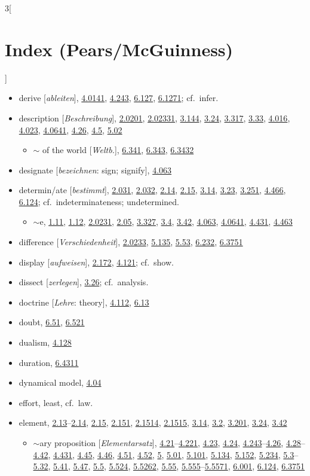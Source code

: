 \documentclass[oneside,openany,12pt]{book}
\newcommand{\indexentry}[1]{\item #1}
\newcommand{\indexsubentry}[1]{\begin{itemize} \item #1 \end{itemize}}
\newcommand{\indexref}[1]{\hyperlink{prop#1}{#1}}
\newcommand{\indexgap}{\bigskip}
\begin{document}
\begin{multicols}{3}[\section*{Index (Pears/McGuinness)}]
\begin{itemize}
\indexentry{derive [\textit{ableiten}], \indexref{4.0141}, \indexref{4.243}, \indexref{6.127}, \indexref{6.1271}; cf.\ infer.}

\indexentry{description [\textit{Beschreibung}], \indexref{2.0201}, \indexref{2.02331}, \indexref{3.144}, \indexref{3.24}, \indexref{3.317}, \indexref{3.33}, \indexref{4.016}, \indexref{4.023}, \indexref{4.0641}, \indexref{4.26}, \indexref{4.5}, \indexref{5.02}}

   \indexsubentry{$\sim$ of the world [\textit{Weltb.}], \indexref{6.341}, \indexref{6.343}, \indexref{6.3432}}

\indexentry{designate [\textit{bezeichnen}: sign; signify], \indexref{4.063}}

\indexentry{determin/ate [\textit{bestimmt}], \indexref{2.031}, \indexref{2.032}, \indexref{2.14}, \indexref{2.15}, \indexref{3.14}, \indexref{3.23}, \indexref{3.251}, \indexref{4.466}, \indexref{6.124}; cf.\ indeterminateness; undetermined.}

   \indexsubentry{$\sim$e, \indexref{1.11}, \indexref{1.12}, \indexref{2.0231}, \indexref{2.05}, \indexref{3.327}, \indexref{3.4}, \indexref{3.42}, \indexref{4.063}, \indexref{4.0641}, \indexref{4.431}, \indexref{4.463}}

\indexentry{difference [\textit{Verschiedenheit}], \indexref{2.0233}, \indexref{5.135}, \indexref{5.53}, \indexref{6.232}, \indexref{6.3751}}

\indexentry{display [\textit{aufweisen}], \indexref{2.172}, \indexref{4.121}; cf.\ show.}

\indexentry{dissect [\textit{zerlegen}], \indexref{3.26}; cf.\ analysis.}

\indexentry{doctrine [\textit{Lehre}: theory], \indexref{4.112}, \indexref{6.13}}

\indexentry{doubt, \indexref{6.51}, \indexref{6.521}}

\indexentry{dualism, \indexref{4.128}}

\indexentry{duration, \indexref{6.4311}}

\indexentry{dynamical model, \indexref{4.04}}

\indexgap

\indexentry{effort, least, cf.\ law.}

\indexentry{element, \indexref{2.13}--\indexref{2.14}, \indexref{2.15}, \indexref{2.151}, \indexref{2.1514}, \indexref{2.1515}, \indexref{3.14}, \indexref{3.2}, \indexref{3.201}, \indexref{3.24}, \indexref{3.42}}

   \indexsubentry{$\sim$ary proposition [\textit{Elementarsatz}], \indexref{4.21}--\indexref{4.221}, \indexref{4.23}, \indexref{4.24}, \indexref{4.243}--\indexref{4.26}, \indexref{4.28}--\indexref{4.42}, \indexref{4.431}, \indexref{4.45}, \indexref{4.46}, \indexref{4.51}, \indexref{4.52}, \indexref{5}, \indexref{5.01}, \indexref{5.101}, \indexref{5.134}, \indexref{5.152}, \indexref{5.234}, \indexref{5.3}--\indexref{5.32}, \indexref{5.41}, \indexref{5.47}, \indexref{5.5}, \indexref{5.524}, \indexref{5.5262}, \indexref{5.55}, \indexref{5.555}--\indexref{5.5571}, \indexref{6.001}, \indexref{6.124}, \indexref{6.3751}}


\end{itemize}
\end{multicols}
\end{document}
